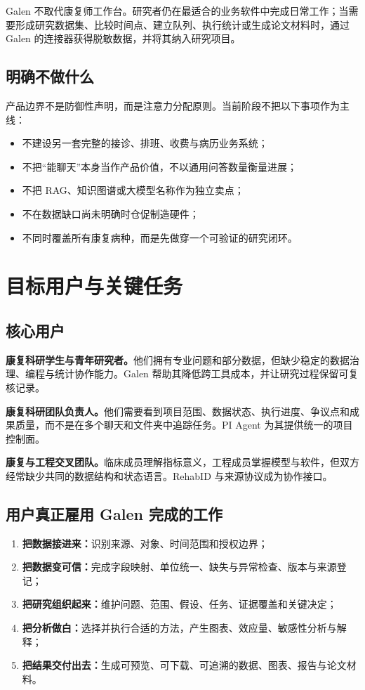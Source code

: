 \documentclass[11pt,a4paper,UTF8]{ctexart}
\begin{document}
Galen 不取代康复师工作台。研究者仍在最适合的业务软件中完成日常工作；当需要形成研究数据集、比较时间点、建立队列、执行统计或生成论文材料时，通过 Galen 的连接器获得脱敏数据，并将其纳入研究项目。

\subsection{明确不做什么}

产品边界不是防御性声明，而是注意力分配原则。当前阶段不把以下事项作为主线：

\begin{itemize}
  \item 不建设另一套完整的接诊、排班、收费与病历业务系统；
  \item 不把“能聊天”本身当作产品价值，不以通用问答数量衡量进展；
  \item 不把 RAG、知识图谱或大模型名称作为独立卖点；
  \item 不在数据缺口尚未明确时仓促制造硬件；
  \item 不同时覆盖所有康复病种，而是先做穿一个可验证的研究闭环。
\end{itemize}

\section{目标用户与关键任务}

\subsection{核心用户}

\textbf{康复科研学生与青年研究者。}他们拥有专业问题和部分数据，但缺少稳定的数据治理、编程与统计协作能力。Galen 帮助其降低跨工具成本，并让研究过程保留可复核记录。

\textbf{康复科研团队负责人。}他们需要看到项目范围、数据状态、执行进度、争议点和成果质量，而不是在多个聊天和文件夹中追踪任务。PI Agent 为其提供统一的项目控制面。

\textbf{康复与工程交叉团队。}临床成员理解指标意义，工程成员掌握模型与软件，但双方经常缺少共同的数据结构和状态语言。RehabID 与来源协议成为协作接口。

\subsection{用户真正雇用 Galen 完成的工作}

\begin{enumerate}
  \item \textbf{把数据接进来：}识别来源、对象、时间范围和授权边界；
  \item \textbf{把数据变可信：}完成字段映射、单位统一、缺失与异常检查、版本与来源登记；
  \item \textbf{把研究组织起来：}维护问题、范围、假设、任务、证据覆盖和关键决定；
  \item \textbf{把分析做白：}选择并执行合适的方法，产生图表、效应量、敏感性分析与解释；
  \item \textbf{把结果交付出去：}生成可预览、可下载、可追溯的数据、图表、报告与论文材料。
\end{enumerate}
\end{document}
